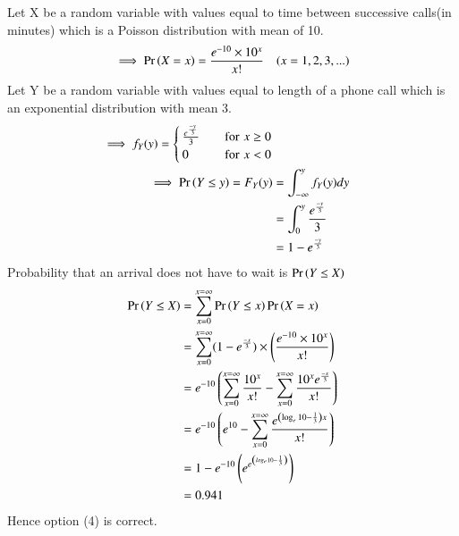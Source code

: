 
Let X be a random variable with values equal to time between successive calls(in minutes) which is a Poisson distribution with mean of 10.\\
\begin{align}
\implies \Pr\left(X=x\right)=\frac{e^{-10}\times 10^{x}}{x!} \quad(x=1,2,3,...)
\end{align}
Let Y be a random variable with values equal to length of a phone call which is an exponential distribution with mean 3.
\begin{align}
\implies f_{Y}(y)=\begin{cases}\frac{e^{\frac{-y}{3}}}{3}\quad &\text{for}\,\,x \geq 0  \\
0 \quad &\text{for}\,\, x<0
\end{cases}\\
\implies \Pr\left(Y \leq y\right)=F_{Y}(y)&=\int_{-\infty}^{y}f_{Y}(y)dy\\
           &=\int_{0}^{y}\frac{e^{\frac{-y}{3}}}{3}\\
           &=1-e^{\frac{-y}{3}}
\end{align}
Probability that an arrival does not have to wait is $\Pr\left(Y\leq X\right)$
\begin{align}
\Pr\left(Y \leq X\right)&=\sum_{x=0}^{x=\infty}\Pr\left(Y \leq x\right)\Pr\left(X=x\right)\\
             &=\sum_{x=0}^{x=\infty}(1-e^{\frac{-x}{3}})\times \left(\frac{e^{-10}\times 10^{x}}{x!}\right)\\
             &=e^{-10}\left(\sum_{x=0}^{x=\infty}\frac{10^{x}}{x!}-\sum_{x=0}^{x=\infty}\frac{10^{x}e^{\frac{-x}{3}}}{x!}\right)\\
             &=e^{-10}\left(e^{10}-\sum_{x=0}^{x=\infty}\frac{e^{\left(\log_{e}10-\frac{1}{3}\right)x}}{x!}\right)\\
             &=1-e^{-10}\left(e^{e^{\left(log_{e}10-\frac{1}{3}\right)}}\right)\\
             &=0.941
\end{align}
Hence option (4) is correct.